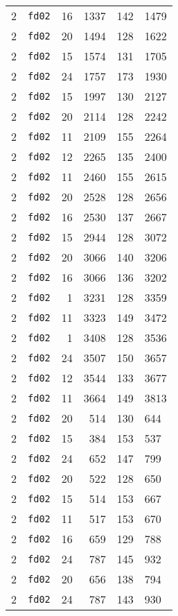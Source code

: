 \documentclass{article}
\begin{document}
\begin{table}[h!]
\begin{tabular}{llrrrl}
    2 & \texttt{fd02} & 16 & 1337 & 142 & 1479 \\
    2 & \texttt{fd02} & 20 & 1494 & 128 & 1622 \\
    2 & \texttt{fd02} & 15 & 1574 & 131 & 1705 \\
    2 & \texttt{fd02} & 24 & 1757 & 173 & 1930 \\
    2 & \texttt{fd02} & 15 & 1997 & 130 & 2127 \\
    2 & \texttt{fd02} & 20 & 2114 & 128 & 2242 \\
    2 & \texttt{fd02} & 11 & 2109 & 155 & 2264 \\
    2 & \texttt{fd02} & 12 & 2265 & 135 & 2400 \\
    2 & \texttt{fd02} & 11 & 2460 & 155 & 2615 \\
    2 & \texttt{fd02} & 20 & 2528 & 128 & 2656 \\
    2 & \texttt{fd02} & 16 & 2530 & 137 & 2667 \\
    2 & \texttt{fd02} & 15 & 2944 & 128 & 3072 \\
    2 & \texttt{fd02} & 20 & 3066 & 140 & 3206 \\
    2 & \texttt{fd02} & 16 & 3066 & 136 & 3202 \\
    2 & \texttt{fd02} & 1 & 3231 & 128 & 3359 \\
    2 & \texttt{fd02} & 11 & 3323 & 149 & 3472 \\
    2 & \texttt{fd02} & 1 & 3408 & 128 & 3536 \\
    2 & \texttt{fd02} & 24 & 3507 & 150 & 3657 \\
    2 & \texttt{fd02} & 12 & 3544 & 133 & 3677 \\
    2 & \texttt{fd02} & 11 & 3664 & 149 & 3813 \\
    2 & \texttt{fd02} & 20 & 514 & 130 & 644 \\
    2 & \texttt{fd02} & 15 & 384 & 153 & 537 \\
    2 & \texttt{fd02} & 24 & 652 & 147 & 799 \\
    2 & \texttt{fd02} & 20 & 522 & 128 & 650 \\
    2 & \texttt{fd02} & 15 & 514 & 153 & 667 \\
    2 & \texttt{fd02} & 11 & 517 & 153 & 670 \\
    2 & \texttt{fd02} & 16 & 659 & 129 & 788 \\
    2 & \texttt{fd02} & 24 & 787 & 145 & 932 \\
    2 & \texttt{fd02} & 20 & 656 & 138 & 794 \\
    2 & \texttt{fd02} & 24 & 787 & 143 & 930 \\

\end{tabular}
\end{table}
\end{document}
